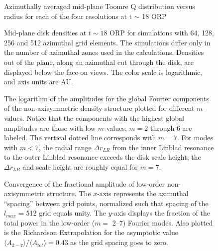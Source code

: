 \documentclass[manuscript]{aastex}
\begin{document}


\newpage

\begin{figure}
\caption{Azimuthally averaged mid-plane Toomre Q distribution versus radius for each of the four resolutions at t $\sim$ 18 ORP}
\label{fig:Final_Q}
\end{figure}

\begin{figure}
\caption
{
Mid-plane disk densities at $t \sim 18$ ORP for simulations with 64, 128, 256 and 512 azimuthal grid elements.
The simulations differ only in the number of  azimuthal zones used in the calculations.  Densities out of the plane, along an azimuthal cut through the disk, are displayed below the face-on views.  The color scale is logarithmic, and axis units are AU. 
}
\label{fig:DensityPlots}
\end{figure}
\newpage

\begin{figure}
\caption
{
The logarithm of the amplitudes for the global Fourier components of the non-axisymmetric density structure plotted for
different $m$-values. Notice that the components with the highest global amplitudes are those with low $m$-values; $m=2$
through 6 are labeled.  The vertical dotted line corresponds with $m=7$.  For modes with $m < 7$,  the radial range
$\Delta r_{LR}$ from  the inner Linblad resonance to the outer Linblad resonance exceeds the disk scale height; the
$\Delta r_{LR}$ and scale height are roughly equal for $m = 7$.
}
\label{fig:Am_vs_log_m}
\end{figure}

\begin{figure}
\caption
{
Convergence of the fractional amplitude of low-order non-axisymmetric structure.  The $x$-axis represents
the azimuthal ``spacing'' between grid points,  normalized such that spacing of the $l_{max}$ = 512 grid
equals unity.
The $y$-axis displays the fraction of the total power in the low-order ($m = $ 2--7) Fourier modes. 
Also plotted is the Richardson Extrapolation for the asymptotic value  
$\langle A_{2-7} \rangle / \langle A_{tot} \rangle = 0.43$ as the grid spacing goes to zero.  
}
\label{fig:Power_Extrap}
\end{figure}
\end{document}
